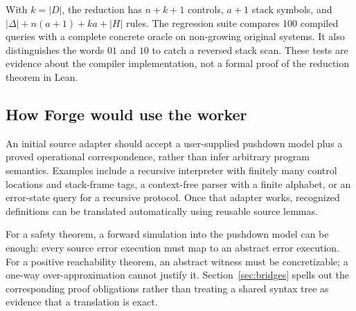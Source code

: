 With $k=|D|$, the reduction has $n+k+1$ controls, $a+1$ stack symbols, and
$|\Delta|+n(a+1)+ka+|H|$ rules. The regression suite compares 100 compiled
queries with a complete concrete oracle on non-growing original systems. It
also distinguishes the words $01$ and $10$ to catch a reversed stack scan.
These tests are evidence about the compiler implementation, not a formal proof
of the reduction theorem in Lean.

\subsection{How Forge would use the worker}
An initial source adapter should accept a user-supplied pushdown model plus a
proved operational correspondence, rather than infer arbitrary program
semantics. Examples include a recursive interpreter with finitely many control
locations and stack-frame tags, a context-free parser with a finite alphabet,
or an error-state query for a recursive protocol. Once that adapter works,
recognized definitions can be translated automatically using reusable source
lemmas.

For a safety theorem, a forward simulation into the pushdown model can be
enough: every source error execution must map to an abstract error execution.
For a positive reachability theorem, an abstract witness must be concretizable;
a one-way over-approximation cannot justify it. Section~\ref{sec:bridges}
spells out the corresponding proof obligations rather than treating a shared
syntax tree as evidence that a translation is exact.

